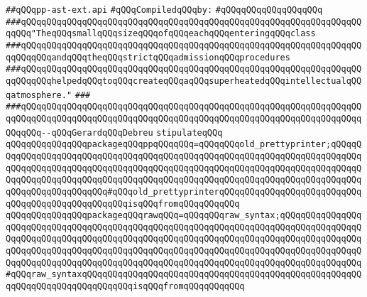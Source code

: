 \label{src/lib/c-kit/src/ast/prettyprint/pp-ast-ext.api}
\verb|##qQQqpp-ast-ext.api|\newline
\newline
\verb|#qQQqCompiledqQQqby:|\newline
\verb|#qQQqqQQqqQQqqQQqqQQq|\newline
\newline
\verb|###qQQqqQQqqQQqqQQqqQQqqQQqqQQqqQQqqQQqqQQqqQQqqQQqqQQqqQQqqQQqqQQqqQQqqQQq"TheqQQqsmallqQQqsizeqQQqofqQQqeachqQQqenteringqQQqclass|\newline
\verb|###qQQqqQQqqQQqqQQqqQQqqQQqqQQqqQQqqQQqqQQqqQQqqQQqqQQqqQQqqQQqqQQqqQQqqQQqqQQqandqQQqtheqQQqstrictqQQqadmissionqQQqprocedures|\newline
\verb|###qQQqqQQqqQQqqQQqqQQqqQQqqQQqqQQqqQQqqQQqqQQqqQQqqQQqqQQqqQQqqQQqqQQqqQQqqQQqhelpedqQQqtoqQQqcreateqQQqaqQQqsuperheatedqQQqintellectualqQQqatmosphere."|\newline
\verb|###|\newline
\verb|###qQQqqQQqqQQqqQQqqQQqqQQqqQQqqQQqqQQqqQQqqQQqqQQqqQQqqQQqqQQqqQQqqQQqqQQqqQQqqQQqqQQqqQQqqQQqqQQqqQQqqQQqqQQqqQQqqQQqqQQqqQQqqQQqqQQqqQQqqQQqqQQq--qQQqGerardqQQqDebreu|\newline
\newline
\newline
\newline
\verb|stipulateqQQq|\newline
\verb|qQQqqQQqqQQqqQQqpackageqQQqppqQQqqQQq=qQQqqQQqold_prettyprinter;qQQqqQQqqQQqqQQqqQQqqQQqqQQqqQQqqQQqqQQqqQQqqQQqqQQqqQQqqQQqqQQqqQQqqQQqqQQqqQQqqQQqqQQqqQQqqQQqqQQqqQQqqQQqqQQqqQQqqQQqqQQqqQQqqQQqqQQqqQQqqQQqqQQqqQQqqQQqqQQqqQQqqQQqqQQqqQQqqQQqqQQqqQQqqQQqqQQqqQQqqQQqqQQqqQQqqQQqqQQqqQQqqQQqqQQqqQQq#qQQqold_prettyprinterqQQqqQQqqQQqqQQqqQQqqQQqqQQqqQQqqQQqqQQqqQQqqQQqqQQqisqQQqfromqQQqqQQqqQQq|\newline
\verb|qQQqqQQqqQQqqQQqpackageqQQqrawqQQq=qQQqqQQqraw_syntax;qQQqqQQqqQQqqQQqqQQqqQQqqQQqqQQqqQQqqQQqqQQqqQQqqQQqqQQqqQQqqQQqqQQqqQQqqQQqqQQqqQQqqQQqqQQqqQQqqQQqqQQqqQQqqQQqqQQqqQQqqQQqqQQqqQQqqQQqqQQqqQQqqQQqqQQqqQQqqQQqqQQqqQQqqQQqqQQqqQQqqQQqqQQqqQQqqQQqqQQqqQQqqQQqqQQqqQQqqQQqqQQqqQQqqQQqqQQqqQQqqQQqqQQqqQQqqQQqqQQqqQQqqQQqqQQqqQQqqQQqqQQqqQQqqQQqqQQq#qQQqraw_syntaxqQQqqQQqqQQqqQQqqQQqqQQqqQQqqQQqqQQqqQQqqQQqqQQqqQQqqQQqqQQqqQQqqQQqqQQqqQQqqQQqisqQQqfromqQQqqQQqqQQq|\newline
